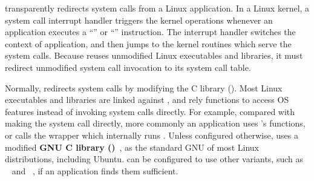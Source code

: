 \label{sec:libos:syscall-redirection}


\thelibos{} transparently redirects system calls from a Linux application. In a Linux kernel, a system call interrupt handler
triggers the kernel operations
whenever an application executes
a ``'' or ``'' instruction.
The interrupt handler
switches the context of application,
and then jumps to the kernel routines which serve the system calls.
Because \thelibos{} reuses
unmodified Linux executables and libraries,
it must redirect
unmodified system call invocation
to its
system call table. %


Normally,
\thelibos{} redirects system calls %
by modifying the C library (\libc{}).
Most Linux executables and libraries
are linked against \libc{},
and rely \libc{} functions to access OS features
instead of
invoking system calls directly.
For example,
compared with making the  system call directly,
more commonly
an application uses \libc{}'s  functions,
or calls the \libc{}  wrapper
which internally runs .
Unless configured otherwise, \thelibos{} uses a modified
{\bf GNU C library (\glibc{})}~\cite{glibc},
as the standard GNU \libc{} of most Linux distributions, including Ubuntu.
\graphene{} can be configured to use other \libc{} variants,
such as ~\cite{uclibc} and ~\cite{musl},
if an application finds them sufficient.




